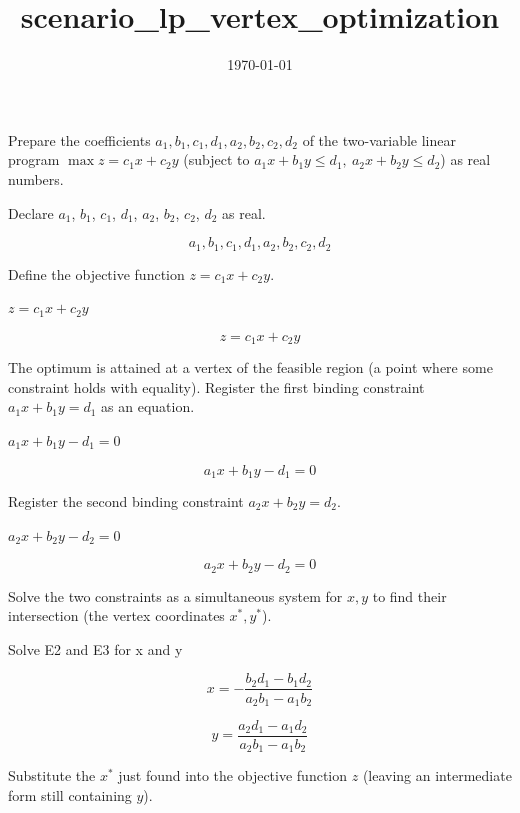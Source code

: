 \documentclass[dvipdfmx]{article}
\title{scenario\_lp\_vertex\_optimization}
\date{\today}
\begin{document}
\maketitle

Prepare the coefficients $a_1,b_1,c_1,d_1,a_2,b_2,c_2,d_2$ of the two-variable linear program $\max z=c_1x+c_2y$ (subject to $a_1x+b_1y\le d_1,\ a_2x+b_2y\le d_2$) as real numbers.

Declare $a_1$, $b_1$, $c_1$, $d_1$, $a_2$, $b_2$, $c_2$, $d_2$ as real.

\[
  a_1, b_1, c_1, d_1, a_2, b_2, c_2, d_2
\]

Define the objective function $z=c_1x+c_2y$.

$z = c_1 x + c_2 y$

\begin{equation}
  z = c_1 x + c_2 y
  \label{eq:E1}
\end{equation}

The optimum is attained at a vertex of the feasible region (a point where some constraint holds with equality). Register the first binding constraint $a_1x+b_1y=d_1$ as an equation.

$a_1 x + b_1 y - d_1 = 0$

\begin{equation}
  a_1 x + b_1 y - d_1 = 0
  \label{eq:E2}
\end{equation}

Register the second binding constraint $a_2x+b_2y=d_2$.

$a_2 x + b_2 y - d_2 = 0$

\begin{equation}
  a_2 x + b_2 y - d_2 = 0
  \label{eq:E3}
\end{equation}

Solve the two constraints as a simultaneous system for $x,y$ to find their intersection (the vertex coordinates $x^*,y^*$).

Solve E2 and E3 for x and y

\begin{equation}
  x = -\frac{b_{2} d_{1}-b_{1} d_{2}}{a_{2} b_{1}-a_{1} b_{2}}
  \label{eq:E4}
\end{equation}

\begin{equation}
  y = \frac{a_{2} d_{1}-a_{1} d_{2}}{a_{2} b_{1}-a_{1} b_{2}}
  \label{eq:E5}
\end{equation}

Substitute the $x^*$ just found into the objective function $z$ (leaving an intermediate form still containing $y$).
\end{document}
